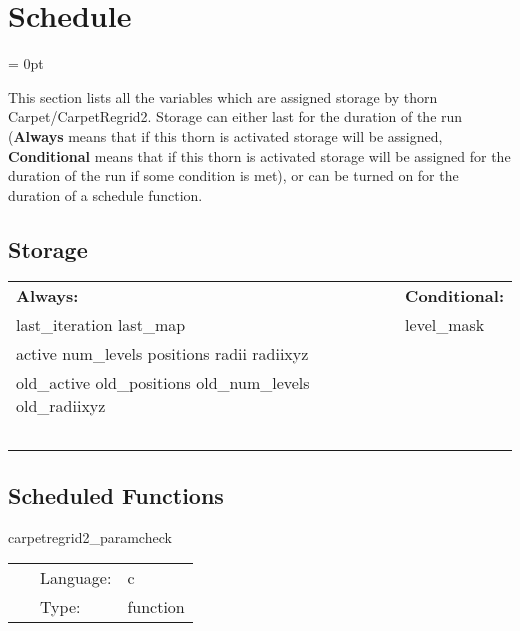 
\section{Schedule} 


\parskip = 0pt


\noindent This section lists all the variables which are assigned storage by thorn Carpet/CarpetRegrid2.  Storage can either last for the duration of the run ({\bf Always} means that if this thorn is activated storage will be assigned, {\bf Conditional} means that if this thorn is activated storage will be assigned for the duration of the run if some condition is met), or can be turned on for the duration of a schedule function.


\subsection*{Storage}

\hspace{5mm}

 \begin{tabular*}{160mm}{ll} 

{\bf Always:}& {\bf Conditional:} \\ 
 last\_iteration last\_map &  level\_mask\\ 
 active num\_levels positions radii radiixyz & ~\\ 
 old\_active old\_positions old\_num\_levels old\_radiixyz & ~\\ 
~ & ~\\ 
\end{tabular*} 


\subsection*{Scheduled Functions}
\vspace{5mm}


\hspace{5mm} carpetregrid2\_paramcheck 

\hspace{5mm}{\it check parameters } 


\hspace{5mm}

 \begin{tabular*}{160mm}{cll} 
~ & Language:  & c \\ 
~ & Type:  & function \\ 
\end{tabular*} 



